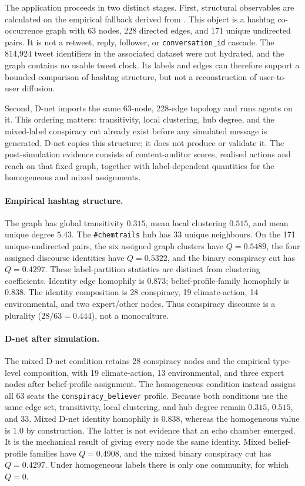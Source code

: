 The application proceeds in two distinct stages.  First, structural
observables are calculated on the empirical fallback derived from
\textcite{debnath2023conspiracy}.  This object is a hashtag co-occurrence
graph with 63 nodes, 228 directed edges, and 171 unique undirected pairs.
It is not a retweet, reply, follower, or \texttt{conversation\_id} cascade.
The 814,924 tweet identifiers in the associated dataset were not hydrated,
and the graph contains no usable tweet clock.  Its labels and edges can
therefore support a bounded comparison of hashtag structure, but not a
reconstruction of user-to-user diffusion.

Second, D-net imports the same 63-node, 228-edge topology and runs agents on
it.  This ordering matters: transitivity, local clustering, hub degree, and
the mixed-label conspiracy cut already exist before any simulated message is
generated.  D-net copies this structure; it does not produce or validate it.
The post-simulation evidence consists of content-auditor scores, realised
actions and reach on that fixed graph, together with label-dependent
quantities for the homogeneous and mixed assignments.

\paragraph{Empirical hashtag structure.}
The graph has global transitivity \(0.315\), mean local clustering \(0.515\),
and mean unique degree \(5.43\).  The \texttt{\#chemtrails} hub has 33 unique
neighbours.  On the 171 unique-undirected pairs, the six assigned graph
clusters have \(Q=0.5489\), the four assigned discourse identities have
\(Q=0.5322\), and the binary conspiracy cut has \(Q=0.4297\).
These label-partition statistics are distinct from clustering coefficients.
Identity edge homophily is \(0.873\);
belief-profile-family homophily is \(0.838\).  The identity composition is
28 conspiracy, 19 climate-action, 14 environmental, and two expert/other
nodes.  Thus conspiracy discourse is a plurality (\(28/63=0.444\)), not a
monoculture.

\paragraph{D-net after simulation.}
The mixed D-net condition retains 28 conspiracy nodes and the empirical
type-level composition, with 19 climate-action, 13 environmental, and three
expert nodes after belief-profile assignment.  The homogeneous condition
instead assigns all 63 seats the
\texttt{conspiracy\_believer} profile.  Because both conditions use the same
edge set, transitivity, local clustering, and hub degree remain \(0.315\),
\(0.515\), and 33.  Mixed D-net identity homophily is \(0.838\), whereas the
homogeneous value is \(1.0\) by construction.  The latter is not evidence
that an echo chamber emerged.  It is the mechanical result of giving every
node the same identity.  Mixed belief-profile families have \(Q=0.4908\),
and the mixed binary conspiracy cut has \(Q=0.4297\).  Under homogeneous
labels there is only one community, for which \(Q=0\).

